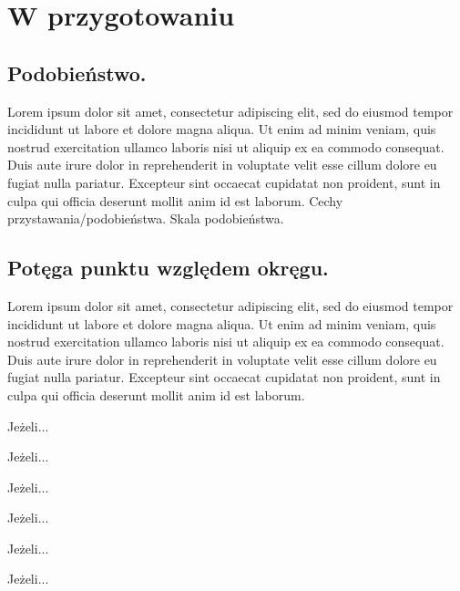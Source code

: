 \documentclass{greaseproof}
\begin{document}
\section{W przygotowaniu}









\subsection{Podobieństwo.} Lorem ipsum dolor sit amet, consectetur adipiscing elit, sed do eiusmod tempor incididunt ut labore et dolore magna aliqua. Ut enim ad minim veniam, quis nostrud exercitation ullamco laboris nisi ut aliquip ex ea commodo consequat. Duis aute irure dolor in reprehenderit in voluptate velit esse cillum dolore eu fugiat nulla pariatur. Excepteur sint occaecat cupidatat non proident, sunt in culpa qui officia deserunt mollit anim id est laborum.
Cechy przystawania/podobieństwa.
Skala podobieństwa.


\subsection{Potęga punktu względem okręgu.} Lorem ipsum dolor sit amet, consectetur adipiscing elit, sed do eiusmod tempor incididunt ut labore et dolore magna aliqua. Ut enim ad minim veniam, quis nostrud exercitation ullamco laboris nisi ut aliquip ex ea commodo consequat. Duis aute irure dolor in reprehenderit in voluptate velit esse cillum dolore eu fugiat nulla pariatur. Excepteur sint occaecat cupidatat non proident, sunt in culpa qui officia deserunt mollit anim id est laborum.
\begin{proposition}
	Jeżeli...
\end{proposition}
\begin{definition}
	Jeżeli...
\end{definition}
\begin{proposition}
	Jeżeli...
\end{proposition}
\begin{definition}[oś potęgowa]
	Jeżeli...
\end{definition}
\begin{theorem}[Monge'a]
	Jeżeli...
\end{theorem}
\begin{theorem}[Auberta]
	Jeżeli...
\end{theorem}
\end{document}
